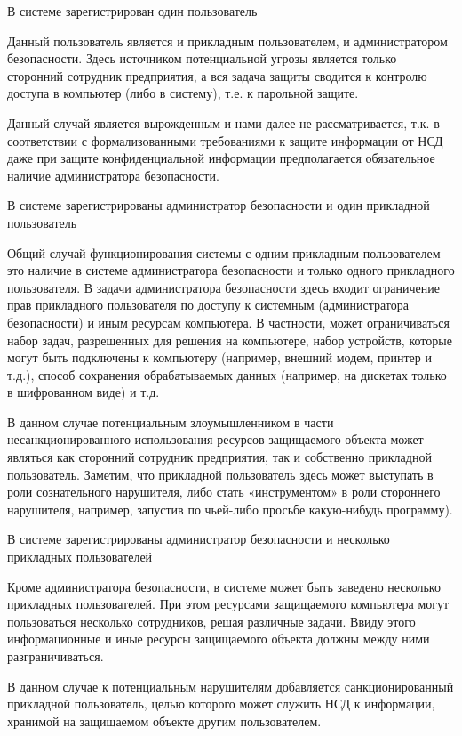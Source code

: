 \documentclass[a4paper,12pt]{extarticle}
\begin{document}
	В системе зарегистрирован один пользователь
	
	Данный пользователь является и прикладным пользователем, и администратором безопасности. Здесь источником потенциальной угрозы является только сторонний сотрудник предприятия, а вся задача защиты сводится к контролю доступа в компьютер (либо в систему), т.е. к парольной защите.
	
	Данный случай является вырожденным и нами далее не рассматривается, т.к. в соответствии с формализованными требованиями к защите информации от НСД даже при защите конфиденциальной информации предполагается обязательное наличие администратора безопасности.
	
	В системе зарегистрированы администратор безопасности и один прикладной пользователь
	
	Общий случай функционирования системы с одним прикладным пользователем – это наличие в системе администратора безопасности и только одного прикладного пользователя. В задачи администратора безопасности здесь входит ограничение прав прикладного пользователя по доступу к системным (администратора безопасности) и иным ресурсам компьютера. В частности, может ограничиваться набор задач, разрешенных для решения на компьютере, набор устройств, которые могут быть подключены к компьютеру (например, внешний модем, принтер и т.д.), способ сохранения обрабатываемых данных (например, на дискетах только в шифрованном виде) и т.д.
	
	В данном случае потенциальным злоумышленником в части несанкционированного использования ресурсов защищаемого объекта может являться как сторонний сотрудник предприятия, так и собственно прикладной пользователь. Заметим, что прикладной пользователь здесь может выступать в роли сознательного нарушителя, либо стать «инструментом» в роли стороннего нарушителя, например, запустив по чьей-либо просьбе какую-нибудь программу).
	
	В системе зарегистрированы администратор безопасности и несколько прикладных пользователей
	
	Кроме администратора безопасности, в системе может быть заведено несколько прикладных пользователей. При этом ресурсами защищаемого компьютера могут пользоваться несколько сотрудников, решая различные задачи. Ввиду этого информационные и иные ресурсы защищаемого объекта должны между ними разграничиваться.
	
	В данном случае к потенциальным нарушителям добавляется санкционированный прикладной пользователь, целью которого может служить НСД к информации, хранимой на защищаемом объекте другим пользователем.
	
\end{document}
